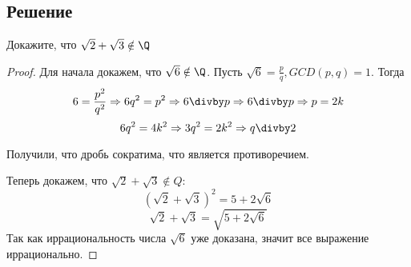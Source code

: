 \subsection*{Решение}
\begin{task}
	Докажите, что $\sqrt{2} + \sqrt{3} \notin \Q$
\end{task}

\begin{proof}
Для начала докажем, что $\sqrt{6} \notin \Q$. Пусть $\sqrt{6} = \frac{p}{q}, GCD(p, q) = 1$. Тогда
\[
6 = \frac{p^2}{q^2} \Rightarrow 6q^2 = p^2 \Rightarrow 6 \divby p \Rightarrow 6 \divby p \Rightarrow p = 2k
\]
\[
6q^2 = 4k^2 \Rightarrow 3q^2 = 2k^2 \Rightarrow q \divby 2
\]

Получили, что дробь сократима, что является противоречием.

Теперь докажем, что $\sqrt{2} + \sqrt{3} \notin Q$:
\[
(\sqrt{2} + \sqrt{3})^2 = 5 + 2\sqrt{6}
\]
\[
\sqrt{2} + \sqrt{3} = \sqrt{5 + 2\sqrt{6}}
\]
Так как иррациональность числа $ \sqrt{6} $ уже доказана, значит все выражение иррационально.
\end{proof}

